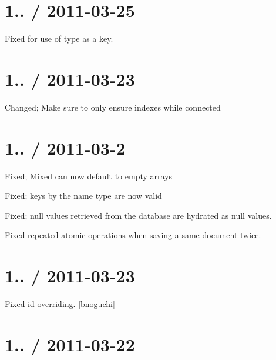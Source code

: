 \section*{1.. / 2011-\/03-\/25 }


\begin{DoxyItemize}
\item Fixed for use of {\ttfamily type} as a key.
\end{DoxyItemize}

\section*{1.. / 2011-\/03-\/23 }


\begin{DoxyItemize}
\item Changed; Make sure to only ensure indexes while connected
\end{DoxyItemize}

\section*{1.. / 2011-\/03-\/2 }


\begin{DoxyItemize}
\item Fixed; Mixed can now default to empty arrays
\item Fixed; keys by the name \textquotesingle{}type\textquotesingle{} are now valid
\item Fixed; null values retrieved from the database are hydrated as null values.
\item Fixed repeated atomic operations when saving a same document twice.
\end{DoxyItemize}

\section*{1.. / 2011-\/03-\/23 }


\begin{DoxyItemize}
\item Fixed \textquotesingle{}id\textquotesingle{} overriding. \mbox{[}bnoguchi\mbox{]}
\end{DoxyItemize}

\section*{1.. / 2011-\/03-\/22 }


